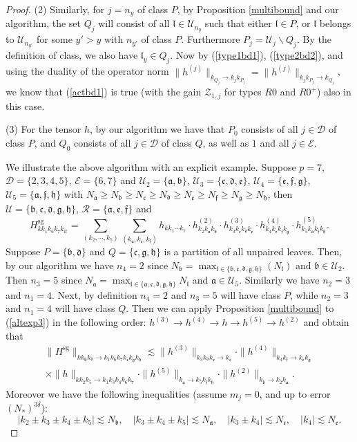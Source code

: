 \documentclass[11 pt,reqno]{amsart}
\theoremstyle{definition}
\theoremstyle{remark}
\numberwithin{equation}{section}
\newcommand{\Dc}{\mathcal{D}}
\newcommand{\Ec}{\mathcal{E}}
\newcommand{\Rc}{\mathcal{R}}
\newcommand{\Uc}{\mathcal{U}}
\newcommand{\Zc}{\mathcal{Z}}
\newcommand{\ff}{\mathfrak{f}}
\newcommand{\hf}{\mathfrak{h}}
\newcommand{\lf}{\mathfrak{l}}
\newcommand{\af}{\mathfrak{a}}
\newcommand{\bff}{\mathfrak{b}}
\newcommand{\cf}{\mathfrak{c}}
\newcommand{\dff}{\mathfrak{d}}
\newcommand{\ef}{\mathfrak{e}}
\newcommand{\gf}{\mathfrak{g}}
\begin{document}
{\begin{proof}
  (2) Similarly, for $j=n_y$ of class $P$, by Proposition \ref{multibound} and our algorithm, the set $Q_j$ will consist of all $\lf\in\Uc_{n_y}$ such that either $\lf\in P$, or $\lf$ belongs to $\Uc_{n_{y'}}$ for some $y'>y$ with $n_{y'}$ of class $P$. Furthermore $P_j = \Uc_j\backslash Q_j$. By the definition of class, we also have $\lf_{y}\in Q_j$. 
Now by (\ref{type1bd1}), (\ref{type2bd2}), and using the duality of the operator norm $\|h^{(j)}\|_{k_{Q_j}\to k_jk_{P_j}}=\|h^{(j)}\|_{k_jk_{P_j}\to k_{Q_j}}$, we know that (\ref{actbd1}) is true (with the gain $\Zc_{1,j}$ for types $R0$ and $R0^+$) also in this case.
  
  (3) For the tensor $h$, by our algorithm we have that $P_0$ consists of all $j\in \Dc$ of class $P$, and $Q_0$ consists of all $j\in \Dc$ of class $Q$, as well as $1$ and all $j\in \Ec$.  
  
We illustrate the above algorithm with an explicit example. Suppose $p=7$, $\Dc =\{2, 3, 4, 5\}$, $\Ec=\{6,7\}$ and $\Uc_2 =\{\af, \bff\}$, $\Uc_3 =\{\cf, \dff, \ef\}$, $\Uc_4 =\{\ef, \ff, \gf\}$, $\Uc_5 =\{\af, \ff, \hf\}$ with $N_\af\geq N_{\bff}\geq N_{\cf}\geq N_{\dff}\geq N_{\ef}\geq N_{\ff}\geq N_{\gf}\geq N_{\hf}$, then $\Uc=\{\bff,\cf,\dff,\gf,\hf\}$, $\Rc =\{\af,\ef,\ff\}$ and
\begin{equation*}H^{\mathrm{sg}}_{kk_1k_6k_7k_\Uc}=\sum_{(k_2,\cdots,k_5)}\sum_{(k_\af,k_\ef,k_\ff)}h_{kk_1\cdots k_7}\cdot h_{k_2k_\af k_\bff}^{(2)} \cdot h_{k_3k_\cf k_\dff k_\ef}^{(3)}\cdot h_{k_4k_\ef k_\ff k_\gf}^{(4)} \cdot h_{k_5k_\af k_\ff k_\hf}^{(5)}.
\end{equation*} Suppose $P=\{\bff, \dff\}$ and $Q=\{\cf, \gf, \hf\}$ is a partition of all unpaired leaves. Then, by our algorithm we have $n_4 = 2$ since $N_\bff = \max_{\lf\in \{\bff, \cf, \dff, \gf, \hf\}} (N_\lf)$ and $\bff \in \Uc_2$.  Then $n_3 = 5$ since $N_\af=\max_{\lf\in\{\af,\cf,\dff,\gf,\hf\}} N_\lf$ and $\af\in \Uc_5$. Similarly we have $n_2 = 3$ and $n_1 = 4$. Next, by definition $n_4=2$ and $n_3=5$ will have class $P$, while $n_2=3$ and $n_1=4$ will have class $Q$. Then we can apply Proposition \ref{multibound} to (\ref{altexp3}) in the following order: $h^{(3)}\to h^{(4)}\to h\to h^{(5)}\to h^{(2)}$ and obtain that
\begin{multline*}
 \|H^{\mathrm{sg}}\|_{kk_\bff k_\dff\to k_1k_6k_7k_\cf k_\gf k_\hf}\lesssim\|h^{(3)}\|_{k_{3}k_\dff k_\ef \to k_\cf} \cdot\|h^{(4)}\|_{k_{4}k_{\ff}\to k_\ef k_\gf} \\\times\|h\|_{kk_2k_5\to k_1k_3k_4k_6k_7}\cdot\|h^{(5)}\|_{k_{\af}\to k_{5} k_\ff k_\hf}\cdot\|h^{(2)}\|_{k_{\bff}\to k_{2} k_\af}.
\end{multline*} Moreover we have the following inequalities (assume $m_j=0$, and up to error $(N_*)^{3\delta}$):
\[|k_2\pm k_3\pm k_4\pm k_5|\lesssim N_\bff,\quad |k_3\pm k_4\pm k_5|\lesssim N_\af,\quad |k_3\pm k_4|\lesssim N_\cf,\quad |k_4|\lesssim N_\ef.\]
 

\end{proof}}
\end{document}

